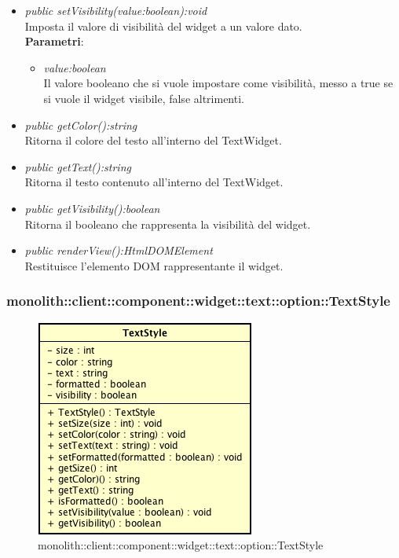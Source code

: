 \begin{itemize}
\begin{itemize}
\begin{itemize}
		\end{itemize} 
		\item \textit{public setVisibility(value:boolean):void}\\
	Imposta il valore di visibilità del widget a un valore dato.
			\\ \textbf{Parametri}: \begin{itemize}
			\item \textit{value:boolean}\\
			Il valore booleano che si vuole impostare come visibilità, messo a true se si vuole il widget visibile, false altrimenti.
	\end{itemize}
	\item \textit{public getColor():string}\\
	Ritorna il colore del testo all'interno del TextWidget.
	\item \textit{public getText():string}\\
	Ritorna il testo contenuto all'interno del TextWidget.
	\item \textit{public getVisibility():boolean}\\
	Ritorna il booleano che rappresenta la visibilità del widget.
	\item \textit{public renderView():HtmlDOMElement}\\
	Restituisce l'elemento DOM rappresentante il widget.
	\end{itemize}
\end{itemize}

\subsubsection{monolith::client::component::widget::text::option::TextStyle}

\label{monolith::client::component::widget::text::option::TextStyle}
\begin{figure}[H]
	\centering
	\includegraphics[scale=0.5]{Sezioni/SottosezioniST/img/TextStyle.png}
	\caption{monolith::client::component::widget::text::option::TextStyle}
\end{figure}


